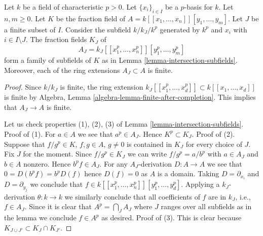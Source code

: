 \begin{lemma}
\label{lemma-power-series-ring-subfields}
Let $k$ be a field of characteristic $p > 0$. Let $\{x_i\}_{i \in I}$
be a $p$-basis for $k$. Let $n, m \geq 0$.
Let $K$ be the fraction field of $A = k[[x_1, \ldots, x_n]][y_1, \ldots, y_m]$.
Let $J$ be a finite subset of $I$. Consider the subfield
$k/k_J/k^p$ generated by $k^p$ and $x_i$ with $i \in I \setminus J$.
The fraction fields $K_J$ of
$$
A_J = k_J[[x_1^p, \ldots, x_n^p]][y_1^p, \ldots, y_m^p]
$$
form a family of subfields of $K$ as in
Lemma \ref{lemma-intersection-subfields}. Moreover, each of the ring extensions
$A_J \subset A$ is finite.
\end{lemma}

\begin{proof}
Since $k/k_J$ is finite, the ring extension
$k_J[[x_1^p, \ldots, x_d^p]] \subset k[[x_1, \ldots, x_d]]$ is finite
by Algebra, Lemma \ref{algebra-lemma-finite-after-completion}.
This implies that $A_J \to A$ is finite.

\medskip\noindent
Let us check properties (1), (2), (3) of
Lemma \ref{lemma-intersection-subfields}.
Proof of (1). For $a \in A$ we see that $a^p \in A_J$.
Hence $K^p \subset K_J$. Proof of (2).
Suppose that $f/g^p \in K$, $f, g \in A$, $g \not = 0$
is contained in $K_J$ for every choice of $J$.
Fix $J$ for the moment. Since $f/g^p \in K_J$ we can write
$f/g^p = a/b^p$ with $a \in A_J$ and $b \in A$ nonzero.
Hence $b^p f \in A_J$. For any $A_J$-derivation $D : A \to A$ we see
that $0 = D(b^pf) = b^p D(f)$ hence $D(f) = 0$ as $A$ is a domain.
Taking $D = \partial_{x_i}$ and $D = \partial_{y_j}$ we conclude
that $f \in k[[x_1^p, \ldots, x_n^p]][y_1^p, \ldots, y_d^p]$.
Applying a $k_J$-derivation $\theta : k \to k$
we similarly conclude that all coefficients of $f$
are in $k_J$, i.e., $f \in A_J$. Since it is clear that
$A^p = \bigcap\nolimits_J A_J$ where $J$ ranges over all subfields
as in the lemma we conclude $f \in A^p$ as desired.
Proof of (3). This is clear because $K_{J \cup J'} \subset K_J \cap K_{J'}$.
\end{proof}
